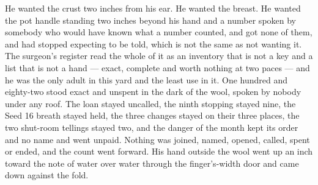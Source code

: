 He wanted the crust two inches from his ear. He wanted the breast. He wanted the pot handle standing two inches beyond his hand and a number spoken by somebody who would have known what a number counted, and got none of them, and had stopped expecting to be told, which is not the same as not wanting it. The surgeon's register read the whole of it as an inventory that is not a key and a list that is not a hand --- exact, complete and worth nothing at two paces --- and he was the only adult in this yard and the least use in it. One hundred and eighty-two stood exact and unspent in the dark of the wool, spoken by nobody under any roof. The loan stayed uncalled, the ninth stopping stayed nine, the Seed 16 breath stayed held, the three changes stayed on their three places, the two shut-room tellings stayed two, and the danger of the month kept its order and no name and went unpaid. Nothing was joined, named, opened, called, spent or ended, and the count went forward. His hand outside the wool went up an inch toward the note of water over water through the finger's-width door and came down against the fold.
